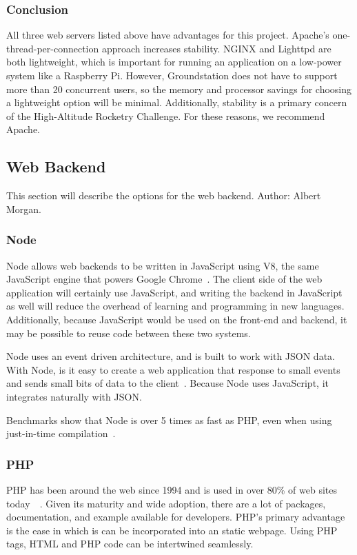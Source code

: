 \documentclass[10pt,draftclsnofoot,onecolumn]{IEEEtran}
\begin{document}
	\subsubsection{Conclusion}
	All three web servers listed above have advantages for this project.
	Apache's one-thread-per-connection approach increases stability.
	NGINX and Lighttpd are both lightweight, which is important for running an application on a low-power system like a Raspberry Pi.
	However, Groundstation does not have to support more than 20 concurrent users, so the memory and processor savings for choosing a lightweight option will be minimal.
	Additionally, stability is a primary concern of the High-Altitude Rocketry Challenge.
	For these reasons, we recommend Apache.


	\subsection{Web Backend}
	This section will describe the options for the web backend. Author: Albert Morgan.
	
	\subsubsection{Node}
	Node allows web backends to be written in JavaScript using V8, the same JavaScript engine that powers Google Chrome~\cite{node}.
	The client side of the web application will certainly use JavaScript, and writing the backend  in JavaScript as well will reduce the overhead of learning and programming in new languages.
	Additionally, because JavaScript would be used on the front-end and backend, it may be possible to reuse code between these two systems.
	
	Node uses an event driven architecture, and is built to work with \ac{JSON} data.
	With Node, is it easy to create a web application that response to small events and sends small bits of data to the client~\cite{event-driven-architecture-node-js}.
	Because Node uses JavaScript, it integrates naturally with \ac{JSON}.
		
	Benchmarks show that Node is over 5 times as fast as PHP, even when using just-in-time compilation~\cite{comparing-node-vs-php-performance}.
	
	\subsubsection{PHP}
	PHP has been around the web since 1994 and is used in over 80\% of web sites today~\cite{history-of-php}~\cite{usage-of-server-side-programming-languages-for-websites}.
	Given its maturity and wide adoption, there are a lot of packages, documentation, and example available for developers.
	PHP's primary advantage is the ease in which is can be incorporated into an static webpage.
	Using PHP tags, HTML and PHP code can be intertwined seamlessly.
	
\end{document}
